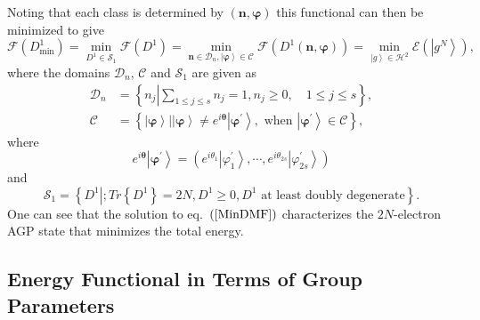 \documentclass[aps,preprint]{revtex4}%
\begin{document}
Noting that each class is determined by $\left(  \boldsymbol{n}%
,\boldsymbol{\varphi}\right)  $ this functional can then be minimized to give
\begin{equation}
\mathcal{F}\left(  D_{\min}^{1}\right)  =\min_{D^{1}\in\mathcal{S}_{1}%
}\mathcal{F}\left(  D^{1}\right)  =\min_{\boldsymbol{n\in}\mathcal{D}%
_{n},\left\vert \boldsymbol{\varphi}\right\rangle \in\mathcal{C}}%
\mathcal{F}\left(  D^{1}\left(  \boldsymbol{n},\boldsymbol{\varphi}\right)
\right)  =\min_{\left\vert g\right\rangle \in\mathcal{H}^{2}}\mathcal{E}%
\left(  \left\vert g^{N}\right\rangle \right)  , \label{MinDMF}%
\end{equation}
where the domains $\mathcal{D}_{n}$, $\mathcal{C}$ and $\mathcal{S}_{1}$ are
given as%
\begin{align}
\mathcal{D}_{n}  &  =\left\{  n_{j}\left\vert \sum_{1\leq j\leq s}%
n_{j}=1,n_{j}\geq0,\quad1\leq j\leq s\right.  \right\}  ,\\
\mathcal{C}  &  =\left\{  \left.  \left\vert \boldsymbol{\varphi}\right\rangle
\right\vert \left\vert \boldsymbol{\varphi}\right\rangle \neq
e^{i\boldsymbol{\theta}}\left\vert \boldsymbol{\varphi}^{\prime}\right\rangle
,\text{ when }\left\vert \boldsymbol{\varphi}^{\prime}\right\rangle
\in\mathcal{C}\right\}  ,
\end{align}
where
\begin{equation}
e^{i\boldsymbol{\theta}}\left\vert \boldsymbol{\varphi}^{\prime}\right\rangle
=\left(  e^{i\theta_{1}}\left\vert \varphi_{1}^{\prime}\right\rangle
,\cdots,e^{i\theta_{2s}}\left\vert \varphi_{2s}^{\prime}\right\rangle \right)
\end{equation}
and
\begin{equation}
\mathcal{S}_{1}=\left\{  \left.  D^{1}\right\vert ;Tr\left\{  D^{1}\right\}
=2N,D^{1}\geq0,D^{1}\text{ at least doubly degenerate}\right\}  .
\end{equation}
One can see that the solution to eq.\ $\left(  \ref{MinDMF}\right)  $
characterizes the $2N$-electron AGP state that minimizes the total energy.

\subsection{Energy Functional in Terms of Group Parameters\label{Group_Param}}
\end{document}
